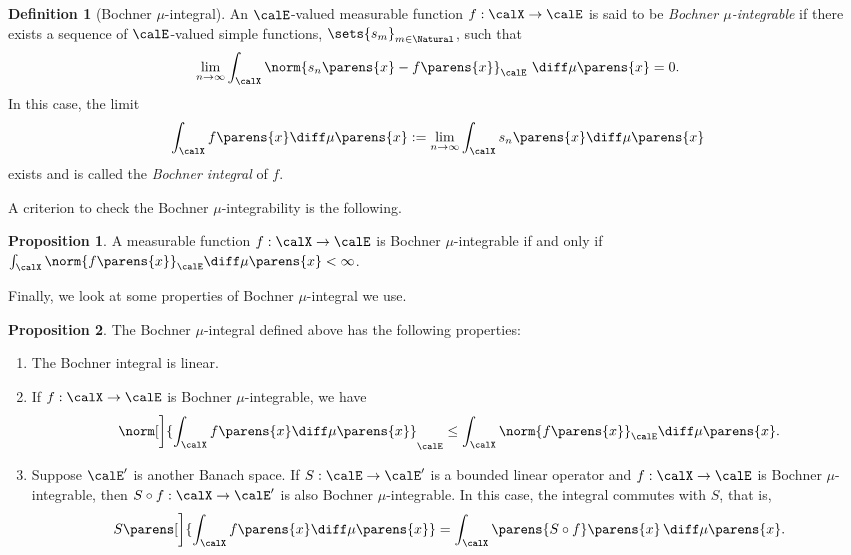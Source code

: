 \documentclass[12pt]{article}
\theoremstyle{definition}
\newtheorem{definition}{Definition}
\theoremstyle{theorem}
\newtheorem{proposition}{Proposition}
\theoremstyle{remark}
\begin{document}
\begin{definition}[Bochner $\mu$-integral]\label{def-bochner-integral}
	An $\calE$-valued measurable function $f: \calX \to \calE$ is said to be \textit{Bochner $\mu$-integrable} if there exists a sequence of $\calE$-valued simple functions, $\sets{s_m}_{m \in \Natural}$, such that
	\begin{align}
		\lim_{n \to \infty} \int_{\calX} \norm{s_n \parens{x} - f \parens{x}}_{\calE} \ \diff \mu \parens{x} = 0. 
	\end{align}
	In this case, the limit
	\begin{align*}
		\int_{\calX} f \parens{x} \diff \mu \parens{x} := \lim_{n \to \infty} \int_{\calX} s_n \parens{x} \diff \mu \parens{x}
	\end{align*}
	exists and is called the \textit{Bochner integral} of $f$. 
\end{definition}

A criterion to check the Bochner $\mu$-integrability is the following. 

\begin{proposition}
	A measurable function $f: \calX \to \calE$ is Bochner $\mu$-integrable if and only if $\int_{\calX} \norm{f \parens{x}}_{\calE} \diff \mu \parens{x} < \infty$. 
\end{proposition}

Finally, we look at some properties of Bochner $\mu$-integral we use. 

\begin{proposition}\label{prop-properties-bochcher-integral}
	The Bochner $\mu$-integral defined above has the following properties: 
	\begin{enumerate}[label=(\alph*)]
		\item \label{prop-properties-bochcher-integral-a} The Bochner integral is linear. 
		\item \label{prop-properties-bochcher-integral-b} If $f: \calX \to \calE$ is Bochner $\mu$-integrable, we have 
		\begin{align*}
			\norm[\bigg]{\int_{\calX} f \parens{x} \diff \mu \parens{x}}_{\calE} \le \int_{\calX} \norm{f \parens{x}}_{\calE} \diff \mu \parens{x}. 
		\end{align*}
		\item \label{prop-properties-bochcher-integral-c} Suppose $\calE'$ is another Banach space. If $S: \calE \to \calE'$ is a bounded linear operator and $f: \calX \to \calE$ is Bochner $\mu$-integrable, then $S \circ f: \calX \to \calE'$ is also Bochner $\mu$-integrable. In this case, the integral commutes with $S$, that is, 
		\begin{align*}
			S \parens[\bigg]{\int_{\calX} f \parens{x} \diff \mu \parens{x}} = \int_{\calX} \parens{S \circ f} \parens{x} \, \diff \mu \parens{x}. 
		\end{align*}
	\end{enumerate}
\end{proposition}
\end{document}
